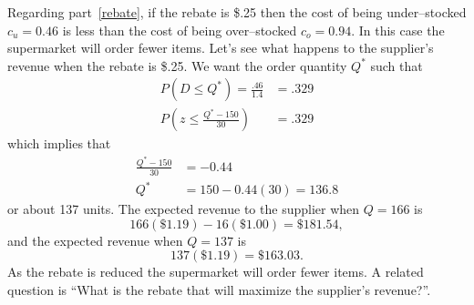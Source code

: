 \begin{enumerate}
\begin{solution}
Regarding part~\ref{rebate}, if the rebate is \$.25 then the cost of being
under--stocked $c_u=0.46$ is less than the cost of being over--stocked
$c_o=0.94$. In this case the supermarket will order fewer items. Let's
see what happens to the supplier's revenue when the rebate is \$.25.
We want the order quantity $Q^{\ast}$ such that
\begin{align*}
  P\left(D \leq Q^{\ast}\right) = \frac{.46}{1.4} &= .329 \\
  P\left(z \leq \frac{Q^{\ast}-150}{30}\right) &= .329
\end{align*}
which implies that
\begin{align*}
  \frac{Q^{\ast}- 150}{30} &= -0.44\\
  Q^{\ast} &= 150 - 0.44(30) = 136.8
\end{align*}
or about 137 units. The expected revenue to the supplier when
$Q=166$ is
\[ 166(\$1.19) - 16(\$1.00) = \$181.54, \]
and the expected revenue when $Q=137$ is
\[ 137(\$1.19) = \$163.03. \]
As the rebate is reduced the supermarket will order fewer
items. A related question is ``What is the rebate that will
maximize the supplier's revenue?''.
\end{solution}



\end{enumerate}
